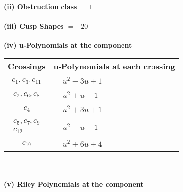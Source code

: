 \documentclass[1p]{elsarticle_modified}
\theoremstyle{definition}
\begin{document}
\flushleft \textbf{(ii) Obstruction class $= 1$}\\~\\
\flushleft \textbf{(iii) Cusp Shapes $= -20$}\\~\\
\newpage\renewcommand{\arraystretch}{1}
\flushleft \textbf{(iv) u-Polynomials at the component}\newline \\
\begin{tabular}{m{50pt}|m{274pt}}
Crossings & \hspace{64pt}u-Polynomials at each crossing \\
\hline $$\begin{aligned}c_{1},c_{3},c_{11}\end{aligned}$$&$\begin{aligned}
&u^2-3 u+1
\end{aligned}$\\
\hline $$\begin{aligned}c_{2},c_{6},c_{8}\end{aligned}$$&$\begin{aligned}
&u^2+u-1
\end{aligned}$\\
\hline $$\begin{aligned}c_{4}\end{aligned}$$&$\begin{aligned}
&u^2+3 u+1
\end{aligned}$\\
\hline $$\begin{aligned}c_{5},c_{7},c_{9}\\c_{12}\end{aligned}$$&$\begin{aligned}
&u^2- u-1
\end{aligned}$\\
\hline $$\begin{aligned}c_{10}\end{aligned}$$&$\begin{aligned}
&u^2+6 u+4
\end{aligned}$\\
\hline
\end{tabular}\\~\\
\newpage\renewcommand{\arraystretch}{1}
\flushleft \textbf{(v) Riley Polynomials at the component}\newline \\
\end{document}
